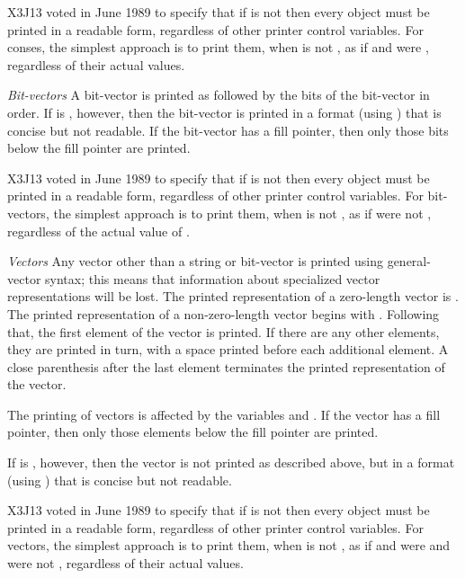 \begin{flushdesc}
\begin{newer}
X3J13 voted in June 1989  to specify that if 
is not {\false} then every object must be printed in a readable form,
regardless of other printer control variables.  For conses, the simplest approach
is to print them, when  is not {\false}, as if 
and  were {\false}, regardless of their actual values.
\end{newer}

\begin{obsolete}
\item[{\it Bit-vectors}]
A bit-vector is printed as \cd{\#*} followed by the bits of the bit-vector
in order.  If  is {\false}, however, then the bit-vector is
printed in a format (using \cd{\#<}) that is concise but not readable.
If the bit-vector has a fill pointer, then only those bits below
the fill pointer are printed.
\end{obsolete}
\begin{newer}
X3J13 voted in June 1989  to specify that if 
is not {\false} then every object must be printed in a readable form,
regardless of other printer control variables.  For bit-vectors, the simplest approach
is to print them, when  is not {\false}, as if 
were not {\false}, regardless of the actual value of .
\end{newer}

\item[{\it Vectors}]
Any vector other than a string or bit-vector is printed using
general-vector syntax; this means that information
about specialized vector representations will be lost.
The printed representation of a zero-length vector is \cd{\#()}.  The
printed representation of a non-zero-length vector begins with \cd{\#(}.
Following that, the first element of the vector is printed.  If
there are any other elements, they are printed in turn, with a space
printed before each additional element.  A close parenthesis
after the
last element terminates the printed representation of the vector.
\begin{obsolete}
The
printing of vectors is affected by the variables  and
.
If the vector has a fill pointer, then only those elements below
the fill pointer are printed.

If  is {\false}, however, then the vector is not printed
as described above, but
in a format (using \cd{\#<}) that is concise but not readable.
\end{obsolete}
\begin{newer}
X3J13 voted in June 1989  to specify that if 
is not {\false} then every object must be printed in a readable form,
regardless of other printer control variables.  For vectors, the simplest approach
is to print them, when  is not {\false}, as if 
and  were {\false} and  were not {\false},
regardless of their actual values.
\end{newer}


\end{flushdesc}

